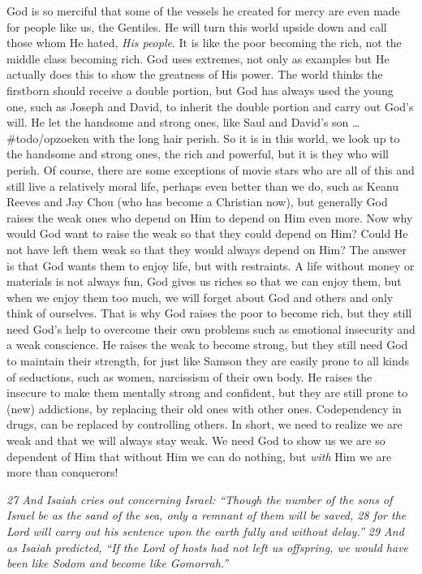 God is so merciful that some of the vessels he created for mercy are
even made for people like us, the Gentiles. He will turn this world
upside down and call those whom He hated, \emph{His people}. It is like
the poor becoming the rich, not the middle class becoming rich. God uses
extremes, not only as examples but He actually does this to show the
greatness of His power. The world thinks the firstborn should receive a
double portion, but God has always used the young one, such as Joseph
and David, to inherit the double portion and carry out God's will. He
let the handsome and strong ones, like Saul and David's son \ldots{}
\#todo/opzoeken with the long hair perish. So it is in this world, we
look up to the handsome and strong ones, the rich and powerful, but it
is they who will perish. Of course, there are some exceptions of movie
stars who are all of this and still live a relatively moral life,
perhaps even better than we do, such as Keanu Reeves and Jay Chou (who
has become a Christian now), but generally God raises the weak ones who
depend on Him to depend on Him even more. Now why would God want to
raise the weak so that they could depend on Him? Could He not have left
them weak so that they would always depend on Him? The answer is that
God wants them to enjoy life, but with restraints. A life without money
or materials is not always fun, God gives us riches so that we can enjoy
them, but when we enjoy them too much, we will forget about God and
others and only think of ourselves. That is why God raises the poor to
become rich, but they still need God's help to overcome their own
problems such as emotional insecurity and a weak conscience. He raises
the weak to become strong, but they still need God to maintain their
strength, for just like Samson they are easily prone to all kinds of
seductions, such as women, narcissism of their own body. He raises the
insecure to make them mentally strong and confident, but they are still
prone to (new) addictions, by replacing their old ones with other ones.
Codependency in drugs, can be replaced by controlling others. In short,
we need to realize we are weak and that we will always stay weak. We
need God to show us we are so dependent of Him that without Him we can
do nothing, but \emph{with} Him we are more than conquerors!

\emph{27 And Isaiah cries out concerning Israel: ``Though the number of
the sons of Israel be as the sand of the sea, only a remnant of them
will be saved, 28 for the Lord will carry out his sentence upon the
earth fully and without delay.'' 29 And as Isaiah predicted,} \emph{``If
the Lord of hosts had not left us offspring,\emph{ }we would have been
like Sodom\emph{ }and become like Gomorrah.''}

